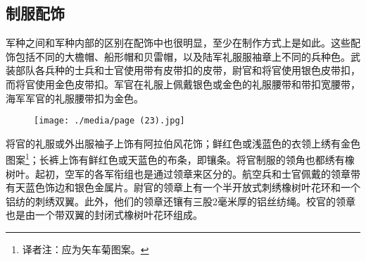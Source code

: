 \subsection{制服配饰}

军种之间和军种内部的区别在配饰中也很明显，至少在制作方式上是如此。这些配饰包括不同的大檐帽、船形帽和贝雷帽，以及陆军礼服服袖章上不同的兵种色。武装部队各兵种的士兵和士官使用带有皮带扣的皮带，尉官和将官使用银色皮带扣，而将官使用金色皮带扣。军官在礼服上佩戴银色或金色的礼服腰带和带扣宽腰带，海军军官的礼服腰带扣为金色。

\begin{figure}
\texttt{[image: ./media/page (23).jpg]}
\end{figure}

将官的礼服或外出服袖子上饰有阿拉伯风花饰；鲜红色或浅蓝色的衣领上绣有金色图案\footnote{译者注：应为矢车菊图案。}；长裤上饰有鲜红色或天蓝色的布条，即镶条。将官制服的领角也都绣有橡树叶。起初，空军的各军衔组也是通过领章来区分的。航空兵和士官佩戴的领章带有天蓝色饰边和银色金属片。尉官的领章上有一个半开放式刺绣橡树叶花环和一个铝纺的刺绣双翼。此外，他们的领章还镶有三股2毫米厚的铝丝纺绳。校官的领章也是由一个带双翼的封闭式橡树叶花环组成。

